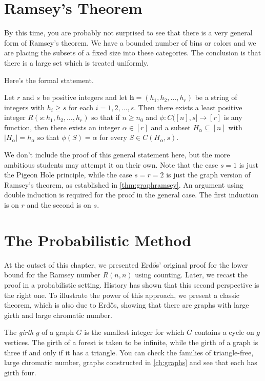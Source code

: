 \section{Ramsey's Theorem}

By this time, you are probably not surprised to see that there
is a very general form of Ramsey's theorem.  We have a bounded
number of bins or colors and we are placing the subsets of a
fixed size into these categories.  The conclusion is that there
is a large set which is treated uniformly.

Here's the formal statement.

\begin{theorem}\label{thm:genramsey}
Let $r$ and $s$ be positive integers and
let $\mathbf{h}=(h_1,h_2,\dots,h_r)$ be a string
of integers with $h_i\ge s$ for each $i=1,2,\dots,s$. 
Then there exists a least positive integer $R(s:h_1,h_2,\dots,h_r)$
so that if $n\ge n_0$ and $\phi:C([n],s]\longrightarrow [r]$
is any function, then there exists an integer $\alpha\in[r]$
and a subset $H_\alpha\subseteq [n]$ with $|H_\alpha|=h_\alpha$
so that $\phi(S)=\alpha$ for every $S\in C(H_\alpha, s)$.
\end{theorem}
We don't include the proof of this general statement here, but
the more ambitious students may attempt it on their own.  Note
that the case $s=1$ is just the Pigeon Hole principle, while the
case $s=r=2$ is just the graph version of Ramsey's theorem,
as established in \autoref{thm:graphramsey}.  An argument
using double induction is required for the proof in the general
case.  The first induction is on $r$ and the second is on $s$.

\section{The Probabilistic Method}\label{s:probmeth:girth}

At the outset of this chapter, we presented Erd\H{o}s' original proof
for the lower bound for the Ramsey number $R(n,n)$ using counting.
Later, we recast the proof in a probabilistic setting.  History has
shown that this second perspective is the right one. To illustrate 
the power of this approach, we present a classic 
theorem, which is also due to Erd\H{o}s, showing that there
are graphs with large girth and large chromatic number.
 
The \textit{girth} $g$ of a graph $G$ is the smallest integer for
which $G$ contains a cycle on $g$ vertices.  The girth of a forest is
taken to be infinite, while the girth of a graph is three if and only
if it has a triangle.  You can check the families of triangle-free,
large chromatic number, graphs constructed in \autoref{ch:graphs} and
see that each has girth four.

